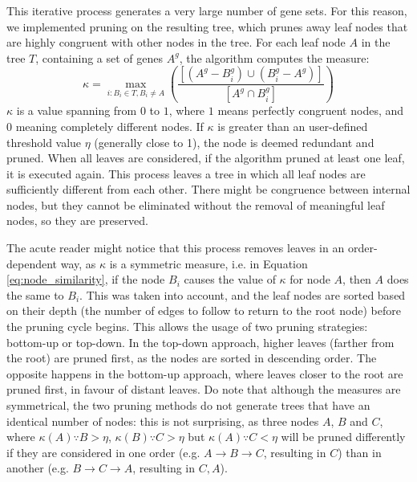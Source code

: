 This iterative process generates a very large number of gene sets.
For this reason, we implemented pruning on the resulting tree, which prunes away
leaf nodes that are highly congruent with other nodes in the tree. For each leaf
node $A$ in the tree $T$, containing a set of genes $A^g$, the algorithm
computes the measure:
\begin{equation}
    \kappa = \max_{i:B_i \in T, B_i \ne A}\left(\frac{[(A^g - B_i^g) \cup (B_i^g - A^g)]}{[A^g \cap B_i^g]}\right)
    \label{eq:node_similarity}
\end{equation}
$\kappa$ is a value spanning from $0$ to $1$, where $1$ means perfectly
congruent nodes, and $0$ meaning completely different nodes. If $\kappa$ is
greater than an user-defined threshold value $\eta$ (generally close to 1),
the node is deemed redundant and pruned. When all leaves are considered, if the
algorithm pruned at least one leaf, it is executed again. This process leaves a
tree in which all leaf nodes are sufficiently different from each other. There
might be congruence between internal nodes, but they cannot be eliminated
without the removal of meaningful leaf nodes, so they are preserved.

The acute reader might notice that this process removes leaves in an
order-dependent way, as $\kappa$ is a symmetric measure, i.e. in Equation
\ref{eq:node_similarity}, if the node $B_i$ causes the value of $\kappa$ for
node $A$, then $A$ does the same to $B_i$.
This was taken into account, and the leaf nodes are sorted based on their depth
(the number of edges to follow to return to the root node) before the pruning
cycle begins. This allows the usage of two pruning strategies: bottom-up or
top-down. In the top-down approach, higher leaves (farther from the root) are
pruned first, as the nodes are sorted in descending order. The opposite happens
in the bottom-up approach, where leaves closer to the root are pruned first, in
favour of distant leaves.
Do note that although the measures are symmetrical, the two pruning methods do
not generate trees that have an identical number of nodes: this is not
surprising, as three nodes $A$, $B$ and $C$, where $\kappa(A) \because B >
\eta$, $\kappa(B) \because C > \eta$ but $\kappa(A)  \because C < \eta$ will be
pruned differently if they are considered in one order (e.g. $A \rightarrow B
\rightarrow C$, resulting in $C$) than in another (e.g. $B \rightarrow C
\rightarrow A$, resulting in $C, A$).

